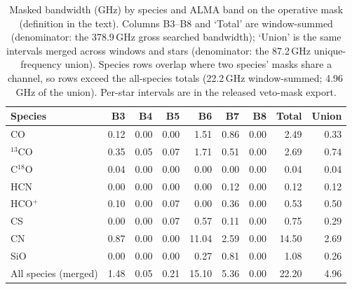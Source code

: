 \documentclass{openjournal}
\begin{document}
\begin{table}
\centering
\small
\setlength{\tabcolsep}{4pt}
\caption{Masked bandwidth (GHz) by species and ALMA band on the
operative mask (definition in the text). Columns B3--B8 and `Total'
are window-summed (denominator: the 378.9\,GHz gross searched
bandwidth); `Union' is the same intervals merged across windows and
stars (denominator: the 87.2\,GHz unique-frequency union). Species
rows overlap where two species' masks share a channel, so rows exceed
the all-species totals (22.2\,GHz window-summed; 4.96\,GHz of the
union). Per-star intervals are in the released veto-mask export.}
\label{tab:maskband}
\begin{tabular}{@{}l r r r r r r r r@{}}
\hline
Species & B3 & B4 & B5 & B6 & B7 & B8 & Total & Union \\
\hline
CO & 0.12 & 0.00 & 0.00 & 1.51 & 0.86 & 0.00 & 2.49 & 0.33 \\
$^{13}$CO & 0.35 & 0.05 & 0.07 & 1.71 & 0.51 & 0.00 & 2.69 & 0.74 \\
C$^{18}$O & 0.04 & 0.00 & 0.00 & 0.00 & 0.00 & 0.00 & 0.04 & 0.04 \\
HCN & 0.00 & 0.00 & 0.00 & 0.00 & 0.12 & 0.00 & 0.12 & 0.12 \\
HCO$^{+}$ & 0.10 & 0.00 & 0.07 & 0.00 & 0.36 & 0.00 & 0.53 & 0.50 \\
CS & 0.00 & 0.00 & 0.07 & 0.57 & 0.11 & 0.00 & 0.75 & 0.29 \\
CN & 0.87 & 0.00 & 0.00 & 11.04 & 2.59 & 0.00 & 14.50 & 2.69 \\
SiO & 0.00 & 0.00 & 0.00 & 0.27 & 0.81 & 0.00 & 1.08 & 0.26 \\
\hline
All species (merged) & 1.48 & 0.05 & 0.21 & 15.10 & 5.36 & 0.00 & 22.20 & 4.96 \\
\hline
\end{tabular}
\end{table}
\end{document}
